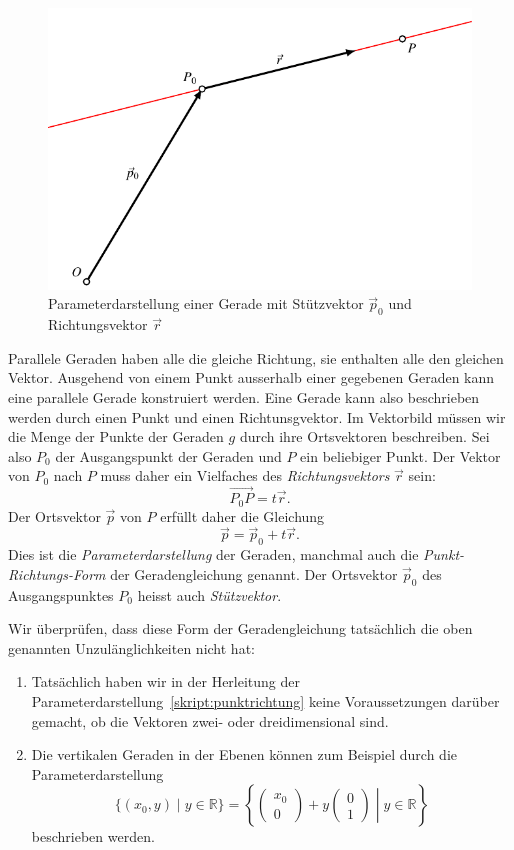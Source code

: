 \begin{figure}
\centering
\includegraphics{3/images/punktrichtung.pdf}
\caption{Parameterdarstellung einer Gerade mit Stützvektor $\vec{p}_0$ und
Richtungsvektor $\vec{r}$
\label{skript:affin:punktrichtung}}
\end{figure}
Parallele Geraden haben alle die gleiche Richtung, sie enthalten alle
den gleichen Vektor.
Ausgehend von einem Punkt ausserhalb einer gegebenen Geraden kann eine
parallele Gerade konstruiert werden.
Eine Gerade kann also beschrieben werden durch einen Punkt und einen
Richtunsgvektor.
Im Vektorbild müssen wir die Menge der Punkte der Geraden $g$ durch ihre
Ortsvektoren beschreiben.
Sei also $P_0$ der Ausgangspunkt der Geraden und $P$ ein beliebiger
Punkt.
Der Vektor von $P_0$ nach $P$ muss daher ein Vielfaches des
{\em Richtungsvektors} $\vec{r}$ sein:
\[
\overrightarrow{P_0P} = t\vec{r}.
\]
Der Ortsvektor $\vec{p}$ von $P$ erfüllt daher die Gleichung
\begin{equation}
\vec{p} = \vec{p}_0 + t\vec{r}.
\label{skript:punktrichtung}
\end{equation}
Dies ist die {\em Parameterdarstellung} der Geraden, manchmal auch die
{\em Punkt-Richtungs-Form} der Geradengleichung genannt.
Der Ortsvektor $\vec{p}_0$ des Ausgangspunktes $P_0$ heisst auch
{\em Stützvektor}.

Wir überprüfen, dass diese Form der Geradengleichung tatsächlich die
oben genannten Unzulänglichkeiten nicht hat:
\begin{enumerate}
\item Tatsächlich haben wir in der Herleitung der
Parameterdarstellung~\eqref{skript:punktrichtung} keine Voraussetzungen
darüber gemacht, ob die Vektoren zwei- oder dreidimensional sind.
\item Die vertikalen Geraden in der Ebenen können zum Beispiel durch die
Parameterdarstellung
\[
\{ (x_0,y)\;|\; y\in\mathbb R\}
=
\left\{
\left.
\begin{pmatrix}x_0\\0\end{pmatrix}
+
y\begin{pmatrix}0\\1\end{pmatrix}
\;
\right|
\;
y\in\mathbb R
\right\}
\]
beschrieben werden.
\end{enumerate}

